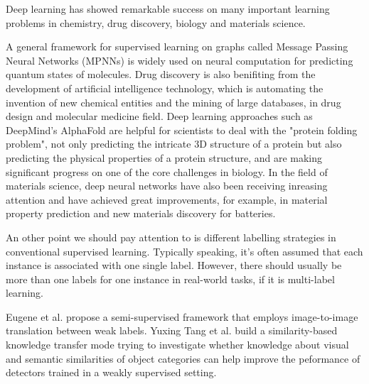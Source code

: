 \documentclass[10pt,twocolumn,letterpaper]{article}
\begin{document}
Deep learning has showed remarkable success on many important learning problems in chemistry, drug discovery, biology and materials science.

A general framework for supervised learning on graphs called Message Passing Neural Networks (MPNNs) is widely used on neural computation for predicting quantum states of molecules.
Drug discovery is also benifiting from the development of artificial intelligence technology, which is automating the invention of new chemical entities and the mining of large databases, in drug design and molecular medicine field.  
Deep learning approaches such as DeepMind's AlphaFold are helpful for scientists to deal with the "protein folding problem", not only predicting the intricate 3D structure of a protein but also predicting the physical properties of a protein structure, and are making significant progress on one of the core challenges in biology.
In the field of materials science, deep neural networks have also been receiving inreasing attention and have achieved great improvements, for example, in material property prediction and new materials discovery for batteries.

An other point we should pay attention to is different labelling strategies in conventional supervised learning.
Typically speaking, it's often assumed that each instance is associated with one single label. However, there should usually be more than one labels for one instance in real-world tasks, if it is multi-label learning.



Eugene et al. propose a semi-supervised framework that employs image-to-image translation between weak labels.
Yuxing Tang et al. build a similarity-based knowledge transfer mode trying to investigate whether knowledge about visual and semantic similarities of object categories can help improve the peformance of detectors trained in a weakly supervised setting.
\end{document}
